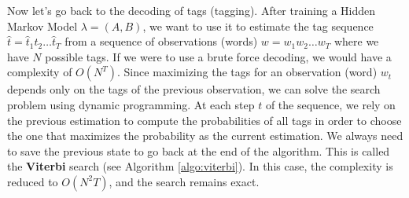 \documentclass{KBook}
\begin{document}
%	
%	
%	
%	
%	
%	

Now let's go back to the decoding of tags (tagging). After training a Hidden Markov Model $\lambda = (A, B)$, we want to use it to estimate the tag sequence $\hat{t} = \hat{t}_1 \hat{t}_2 \ldots \hat{t}_T$ from a sequence of observations (words) $w = w_1 w_2 \ldots w_T$ where we have $N$ possible tags. If we were to use a brute force decoding, we would have a complexity of $O(N^T)$. Since maximizing the tags for an observation (word) $w_t$ depends only on the tags of the previous observation, we can solve the search problem using dynamic programming. At each step $t$ of the sequence, we rely on the previous estimation to compute the probabilities of all tags in order to choose the one that maximizes the probability as the current estimation. We always need to save the previous state to go back at the end of the algorithm. This is called the \textbf{Viterbi} search (see Algorithm \ref{algo:viterbi}). In this case, the complexity is reduced to $O(N^2T)$, and the search remains exact.
\end{document}

